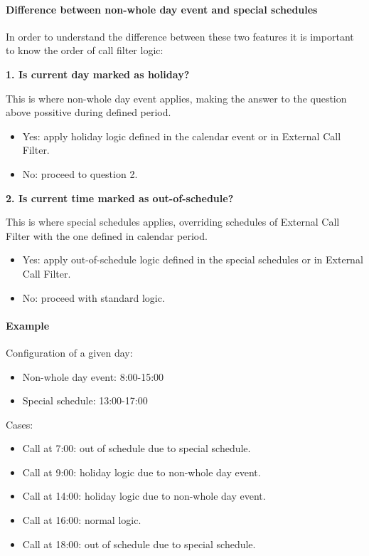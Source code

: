\documentclass[letterpaper,10pt,english]{sphinxmanual}
\begin{document}
\paragraph{Difference between non-whole day event and special schedules}
\label{administration_portal/client/vpbx/routing_tools/calendars:difference-between-non-whole-day-event-and-special-schedules}
In order to understand the difference between these two features it is important to know the order of call filter logic:

\textbf{1. Is current day marked as holiday?}

This is where non-whole day event applies, making the answer to the question above possitive during defined period.
\begin{itemize}
\item {} 
Yes: apply holiday logic defined in the calendar event or in External Call Filter.

\item {} 
No: proceed to question 2.

\end{itemize}

\textbf{2. Is current time marked as out-of-schedule?}

This is where special schedules applies, overriding schedules of External Call Filter with the one defined in calendar
period.
\begin{itemize}
\item {} 
Yes: apply out-of-schedule logic defined in the special schedules or in External Call Filter.

\item {} 
No: proceed with standard logic.

\end{itemize}
\paragraph{Example}

Configuration of a given day:
\begin{itemize}
\item {} 
Non-whole day event: 8:00-15:00

\item {} 
Special schedule: 13:00-17:00

\end{itemize}

Cases:
\begin{itemize}
\item {} 
Call at 7:00: out of schedule due to special schedule.

\item {} 
Call at 9:00: holiday logic due to non-whole day event.

\item {} 
Call at 14:00: holiday logic due to non-whole day event.

\item {} 
Call at 16:00: normal logic.

\item {} 
Call at 18:00: out of schedule due to special schedule.

\end{itemize}
\end{document}
